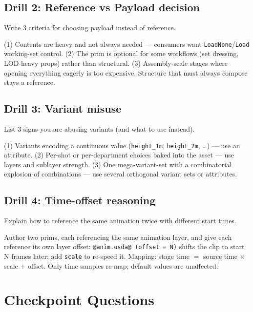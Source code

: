 \subsection*{Drill 2: Reference vs Payload decision}
Write 3 criteria for choosing payload instead of reference.
\begin{DrillSolution}
(1) Contents are heavy and not always needed --- consumers want
\texttt{LoadNone}/\texttt{Load} working-set control. (2) The prim is optional
for some workflows (set dressing, LOD-heavy props) rather than structural.
(3) Assembly-scale stages where opening everything eagerly is too expensive.
Structure that must always compose stays a reference.
\end{DrillSolution}

\subsection*{Drill 3: Variant misuse}
List 3 signs you are abusing variants (and what to use instead).
\begin{DrillSolution}
(1) Variants encoding a continuous value (\texttt{height\_1m},
\texttt{height\_2m}, \ldots) --- use an attribute. (2) Per-shot or
per-department choices baked into the asset --- use layers and sublayer
strength. (3) One mega-variant-set with a combinatorial explosion of
combinations --- use several orthogonal variant sets or attributes.
\end{DrillSolution}

\subsection*{Drill 4: Time-offset reasoning}
Explain how to reference the same animation twice with different start times.
\begin{DrillSolution}
Author two prims, each referencing the same animation layer, and give each
reference its own layer offset: \texttt{@anim.usda@ (offset = N)} shifts the
clip to start N frames later; add \texttt{scale} to re-speed it. Mapping:
stage time $=$ source time $\times$ scale $+$ offset. Only time samples
re-map; default values are unaffected.
\end{DrillSolution}

\section*{Checkpoint Questions}

